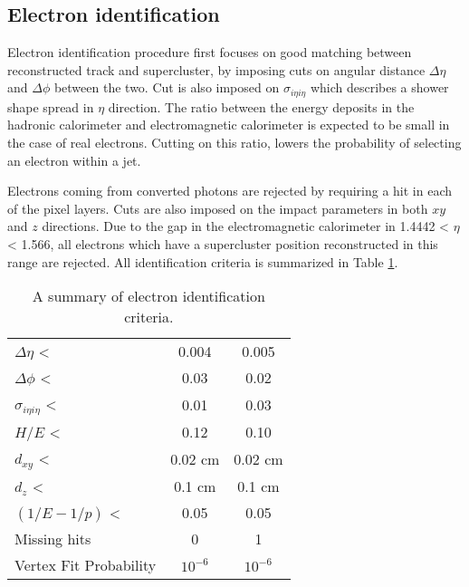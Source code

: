 \subsection{Electron identification}

Electron identification procedure first focuses on good matching between reconstructed track and supercluster, by imposing cuts on angular distance $\Delta \eta$ and $\Delta \phi$ between the two. Cut is also imposed on $\sigma_{i\eta i\eta}$ which describes a shower shape spread in $\eta$ direction. The ratio between the energy deposits in the hadronic calorimeter and electromagnetic calorimeter is expected to be small in the case of real electrons. Cutting on this ratio, lowers the probability of selecting an electron within a jet.
\par Electrons coming from converted photons are rejected by requiring a hit in each of the pixel layers. Cuts are also imposed on the impact parameters in both $xy$ and $z$ directions. Due to the gap in the electromagnetic calorimeter in 1.4442 < $\eta$ < 1.566, all electrons which have a supercluster position reconstructed in this range are rejected. All identification criteria is summarized in Table \ref{tab:eleID}.
 \begin{table}[h]
\centering
  \caption{A summary of electron identification criteria.}
  \label{tab:eleID}
  \begin{tabular}{ l  c c}
      \hline
      \hline
    		$\Delta\eta$ < &  0.004 & 0.005 \\
     	$\Delta\phi$ < &  0.03 & 0.02 \\
     	$\sigma_{i\eta i\eta}$ < & 0.01 & 0.03 \\
		$H/E$ < & 0.12 & 0.10 \\
		$d_{xy}$ < & 0.02 cm & 0.02 cm \\
		$d_{z}$ <  & 0.1 cm & 0.1 cm \\
		$(1/E - 1/p)$ < & 0.05 & 0.05\\
		Missing hits  & 0 & 1 \\
		Vertex Fit Probability & $10^{-6}$ & $10^{-6}$ \\    	

      \hline
      \hline 
  \end{tabular}
\end{table}



